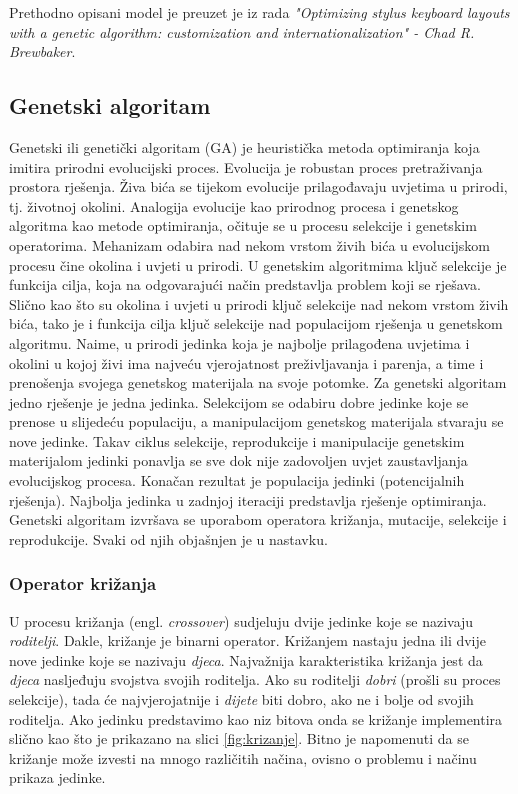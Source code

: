 \documentclass[times, utf8, zavrsni]{fer}
\begin{document}
Prethodno opisani model je preuzet je iz rada \emph{"Optimizing stylus keyboard layouts with a genetic algorithm: customization and internationalization" - Chad R. Brewbaker}.

\subsection{Genetski algoritam}
Genetski ili genetički algoritam (GA)  je heuristička metoda optimiranja koja imitira prirodni evolucijski proces. Evolucija je robustan proces pretraživanja prostora rješenja. Živa bića se tijekom evolucije prilagođavaju uvjetima u prirodi, tj. životnoj okolini. Analogija evolucije kao prirodnog procesa i genetskog algoritma kao metode optimiranja, očituje se u procesu selekcije i genetskim operatorima. Mehanizam odabira nad nekom vrstom živih bića u evolucijskom procesu čine okolina i uvjeti u prirodi. U genetskim algoritmima ključ selekcije je funkcija cilja, koja na odgovarajući način predstavlja problem koji se rješava. Slično kao što su okolina i uvjeti u prirodi ključ selekcije nad nekom vrstom živih bića, tako je i funkcija cilja ključ selekcije nad populacijom rješenja u genetskom algoritmu. Naime, u prirodi jedinka koja je najbolje prilagođena uvjetima i okolini u kojoj živi ima najveću vjerojatnost preživljavanja i parenja, a time i prenošenja svojega genetskog materijala na svoje potomke. Za genetski algoritam jedno rješenje je jedna jedinka. Selekcijom se odabiru dobre jedinke koje se prenose u slijedeću populaciju, a manipulacijom genetskog materijala stvaraju se nove jedinke. Takav ciklus selekcije, reprodukcije i manipulacije genetskim materijalom jedinki ponavlja se sve dok nije zadovoljen uvjet zaustavljanja evolucijskog procesa. Konačan rezultat je populacija jedinki (potencijalnih rješenja). Najbolja jedinka u zadnjoj iteraciji predstavlja rješenje optimiranja. Genetski algoritam izvršava se uporabom operatora križanja, mutacije, selekcije i reprodukcije. Svaki od njih objašnjen je u nastavku.

\subsubsection{Operator križanja}
U procesu križanja (engl. \emph{crossover}) sudjeluju dvije jedinke koje se nazivaju \emph{roditelji}. Dakle, križanje je binarni operator. Križanjem nastaju jedna ili dvije nove jedinke koje se nazivaju \emph{djeca}. Najvažnija karakteristika križanja jest da \emph{djeca} nasljeđuju svojstva svojih roditelja. Ako su roditelji \emph{dobri} (prošli su proces selekcije), tada će najvjerojatnije i \emph{dijete} biti dobro, ako ne i bolje od svojih roditelja. Ako jedinku predstavimo kao niz bitova onda se križanje implementira slično kao što je prikazano na slici \ref{fig:krizanje}. Bitno je napomenuti da se križanje može izvesti na mnogo različitih načina, ovisno o problemu i načinu prikaza jedinke.
\end{document}
